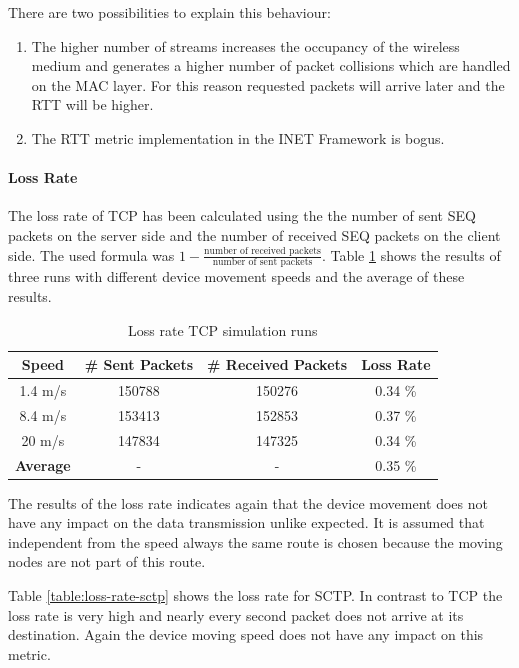 \documentclass[a4paper]{article}
\begin{document}
There are two possibilities to explain this behaviour:
\begin{enumerate}
	\item The higher number of streams increases the occupancy of the wireless medium and generates a higher number of packet collisions which are handled on the MAC layer. For this reason requested packets will arrive later and the RTT will be higher.
	\item The RTT metric implementation in the INET Framework is bogus.
\end{enumerate}

\paragraph{Loss Rate}

The loss rate of TCP has been calculated using the the number of sent SEQ packets on the server side and the number of received SEQ packets on the client side. The used formula was $1 - \frac{\text{number of received packets}}{\text{number of sent packets}}$.
Table \ref{table:loss-rate-tcp} shows the results of three runs with different device movement speeds and the average of these results.
\begin{table}[H]
\centering
\begin{tabular}{cccc}

\textbf{Speed} & \textbf{\# Sent Packets} & \textbf{\# Received Packets} & \textbf{Loss Rate} \\ 
\hline 
\hline
1.4 m/s & 150788 & 150276 & 0.34 \% \\ 

8.4 m/s & 153413 & 152853 & 0.37 \% \\ 

20 m/s & 147834 & 147325 & 0.34 \% \\ 
 \hline
\textbf{Average} & - & - & 0.35 \% \\ 
\end{tabular} 
\caption{Loss rate TCP simulation runs}
\label{table:loss-rate-tcp}
\end{table}

The results of the loss rate indicates again that the device movement does not have any impact on the data transmission unlike expected. It is assumed that independent from the speed always the same route is chosen because the moving nodes are not part of this route.
\pagebreak

Table \ref{table:loss-rate-sctp} shows the loss rate for SCTP. In contrast to TCP the loss rate is very high and nearly every second packet does not arrive at its destination. Again the device moving speed does not have any impact on this metric.
\end{document}
